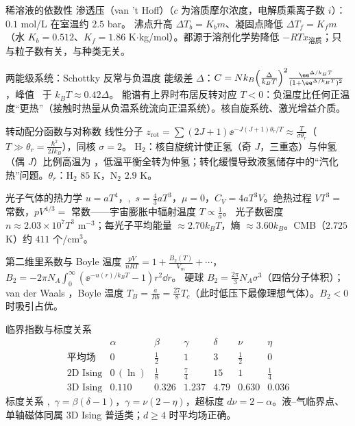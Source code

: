 \begin{结论}{稀溶液的依数性}
渗透压（van 't Hoff）（$c$ 为溶质摩尔浓度，电解质乘离子数 $i$）：$0.1$ mol/L 在室温约 $2.5$ bar。
沸点升高 $\Delta T_b=K_bm$、凝固点降低 $\Delta T_f=K_fm$（水 $K_b=0.512$、$K_f=1.86$ K$\cdot$kg/mol）。都源于溶剂化学势降低 $-RTx_{\text{溶质}}$；只与粒子数有关，与种类无关。
\end{结论}

\begin{结论}{两能级系统：Schottky 反常与负温度}
能级差 $\Delta$：$C=Nk_B\Bigl(\frac{\Delta}{k_BT}\Bigr)^2\frac{\ee^{\Delta/k_BT}}{(1+\ee^{\Delta/k_BT})^2}$，峰值 \ 于 $k_BT\approx0.42\Delta$。
能谱有上界时布居反转对应 $T<0$：负温度比任何正温度“更热”（接触时热量从负温系统流向正温系统）。核自旋系统、激光增益介质。
\end{结论}

\begin{结论}{转动配分函数与对称数}
线性分子 $z_{\text{rot}}=\sum(2J+1)\ee^{-J(J+1)\theta_r/T}\approx\frac{T}{\sigma\theta_r}$（$T\gg\theta_r=\frac{\hbar^2}{2Ik_B}$），同核 $\sigma=2$。
$\mathrm H_2$：核自旋统计使正氢（奇 $J$，三重态）与仲氢（偶 $J$）比例高温为 ，低温平衡全转为仲氢；转化缓慢导致液氢储存中的“汽化热”问题。$\theta_r$：$\mathrm H_2$ $85$ K，$\mathrm N_2$ $2.9$ K。
\end{结论}

\begin{结论}{光子气体的热力学}
$u=aT^4$，,\ $s=\frac43aT^3$，$\mu=0$，$C_V=4aT^3V$。绝热过程 $VT^3=$ 常数，$pV^{4/3}=$ 常数——宇宙膨胀中辐射温度 $T\propto\frac1a$。
光子数密度 $n\approx2.03\times10^7T^3$ m$^{-3}$；每光子平均能量 $\approx2.70k_BT$，熵 $\approx3.60k_B$。CMB（$2.725$ K）约 $411$ 个/cm$^3$。
\end{结论}

\begin{结论}{第二维里系数与 Boyle 温度}
$\frac{pV}{nRT}=1+\frac{B_2(T)}{V_m}+\cdots$，$B_2=-2\pi N_A\int_0^\infty(\ee^{-u(r)/k_BT}-1)r^2\dd r$。
硬球 $B_2=\frac{2\pi}3N_A\sigma^3$（四倍分子体积）；van der Waals ，Boyle 温度 $T_B=\frac a{Rb}=\frac{27}8T_c$（此时低压下最像理想气体）。$B_2<0$ 时吸引占优。
\end{结论}

\begin{结论}{临界指数与标度关系}
\[
\begin{array}{lcccccc}
&\alpha&\beta&\gamma&\delta&\nu&\eta\\\hline
\text{平均场}&0&\frac12&1&3&\frac12&0\\
\text{2D Ising}&0\,(\ln)&\frac18&\frac74&15&1&\frac14\\
\text{3D Ising}&0.110&0.326&1.237&4.79&0.630&0.036
\end{array}
\]
标度关系 ,\ $\gamma=\beta(\delta-1)$，$\gamma=\nu(2-\eta)$，超标度 $d\nu=2-\alpha$。液--气临界点、单轴磁体同属 3D Ising 普适类；$d\ge4$ 时平均场正确。
\end{结论}

